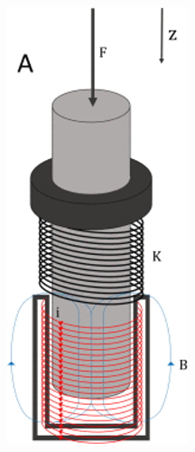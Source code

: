 \begin{figure}[h]
\centering
    \includegraphics[width=\textwidth]{figures/magnetic-spring.png}
\caption{}
\label{fig:magnetic-spring.png}
\end{figure}

